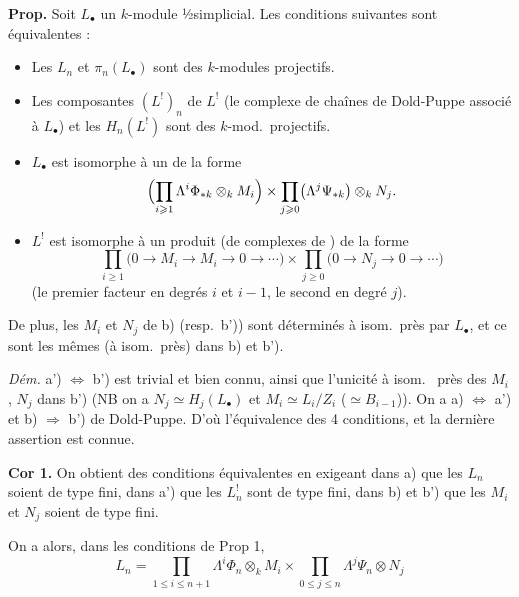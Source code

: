 \documentclass[11pt,a4paper]{article}
\begin{document}
\textbf{Prop.} Soit $L_{\bullet}$ un $k$-module ½simplicial. Les conditions
suivantes sont équivalentes :
\begin{itemize}
  \item[a)] Les $L_{n}$ et $\pi_{n}(L_{\bullet})$ sont des $k$-modules
  projectifs.
  \item[a')] Les composantes  $(L^{!})_{n}$ de $L^{!}$ (le
  complexe de chaînes de Dold-Puppe associé à $L_{\bullet}$) et les
  $H_{n}(L^{!})$ sont des $k$-mod.\ projectifs.
  \item[b)] $L_{\bullet}$ est isomorphe à un 
    de la forme
  \[
    \Bigl(\prod_{i \geqslant 1} \Lambda^{i}\Phi_{*k} \otimes_{k}
    M_{i}\Bigr) \times \prod_{j \geqslant 0} \bigl(\Lambda^{j}\Psi_{*k}\bigr)
    \otimes_{k} N_{j} .
  \]
  \item[b')] $L^{!}$ est isomorphe à un produit (de complexes de
  ) de la forme
  \[
    \prod_{i \geqslant 1} \bigl(0 \to M_{i} \to M_{i} \to 0 \to
    \cdots\bigr) \times \prod_{j \geqslant 0} \bigl(0 \to N_{j} \to 0 \to
    \cdots\bigr)
  \]
  (le premier facteur en degrés $i$ et $i-1$, le second en degré
  $j$).
\end{itemize}

De plus, les $M_{i}$ et $N_{j}$ de b) (resp.\ b')) sont déterminés à isom.\
près par $L_{\bullet}$, et ce sont les mêmes (à isom.\ près) dans b) et b').

\emph{Dém.} a') $\Leftrightarrow$ b') est trivial et bien connu, ainsi que
l'unicité à isom.\ \add{can.} près des $M_{i}$, $N_{j}$ dans b') (NB on a
$N_{j} \simeq H_{j}(L_{\bullet})$ et $M_{i} \simeq L_{i}/Z_{i}$ ($\simeq
B_{i-1}$)). On a a) $\Leftrightarrow$ a') et b) $\Rightarrow$ b')
\add{\uncertain{par le}} \ill{} de Dold-Puppe. D'où l'équivalence des 4
conditions, et la dernière assertion est connue.

\textbf{Cor 1.}  On obtient \ill{} des
conditions équivalentes en exigeant \add{de plus} dans a) que les $L_{n}$
\struck{$\pi_{n}(L_{\bullet})$} soient de type fini, dans a') que les
$L^{!}_{n}$ \struck{$H_{n}(L^{!})$} sont de type fini, dans b) et b') que
les $M_{i}$ et $N_{j}$ soient de type fini.

On a alors, dans les conditions de Prop 1,
\[
  L_{n} = \prod_{1 \leqslant i \leqslant n+1} \Lambda^{i}\Phi_{n} \otimes_{k}
  M_{i} \times \prod_{0 \leqslant j \leqslant n} \Lambda^{j}\Psi_{n}
  \otimes N_{j}
\]
\end{document}
